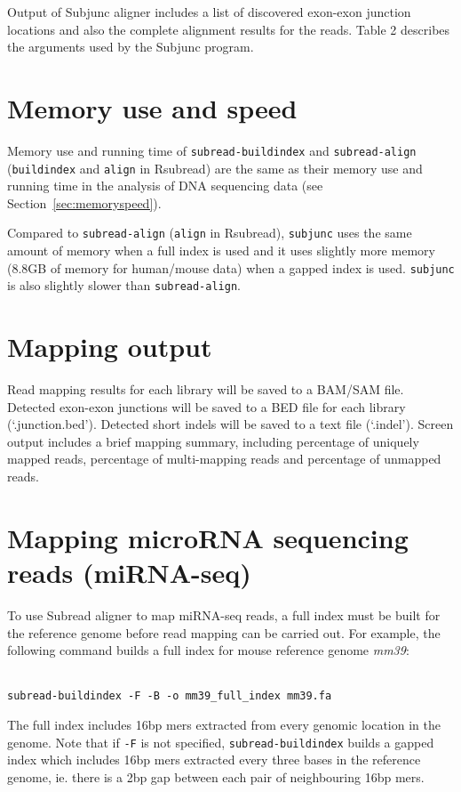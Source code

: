 \documentclass[12pt]{report}
\newcommand{\code}[1]{{\small\texttt{#1}}}
\newcommand{\Subread}{\textsf{Subread}}
\newcommand{\Subjunc}{\textsf{Subjunc}}
\newcommand{\Rsubread}{\textsf{Rsubread}}
\begin{document}
Output of {\Subjunc} aligner includes a list of discovered exon-exon junction locations and also the complete alignment results for the reads.
Table 2 describes the arguments used by the {\Subjunc} program.\\

\section{Memory use and speed}

Memory use and running time of \code{subread-buildindex} and \code{subread-align} (\code{buildindex} and \code{align} in \Rsubread) are the same as their memory use and running time in the analysis of DNA sequencing data (see Section~\ref{sec:memoryspeed}).

Compared to \code{subread-align} (\code{align} in \Rsubread), \code{subjunc} uses the same amount of memory when a full index is used and it uses slightly more memory (8.8GB of memory for human/mouse data) when a gapped index is used. 
\code{subjunc} is also slightly slower than \code{subread-align}.


\section{Mapping output}

Read mapping results for each library will be saved to a BAM/SAM file.
Detected exon-exon junctions will be saved to a BED file for each library (`.junction.bed').
Detected short indels will be saved to a text file (`.indel').
Screen output includes a brief mapping summary, including percentage of uniquely mapped reads, percentage of multi-mapping reads and percentage of unmapped reads.

\section{Mapping microRNA sequencing reads (miRNA-seq)}

To use {\Subread} aligner to map miRNA-seq reads, a full index must be built for the reference genome before read mapping can be carried out.
For example, the following command builds a full index for mouse reference genome \emph{mm39}:

\code{\\
subread-buildindex -F -B -o mm39\_full\_index mm39.fa \\
}

The full index includes 16bp mers extracted from every genomic location in the genome.
Note that if \code{-F} is not specified, \code{subread-buildindex} builds a gapped index which includes 16bp mers extracted every three bases in the reference genome, ie. there is a 2bp gap between each pair of neighbouring 16bp mers.
\end{document}
